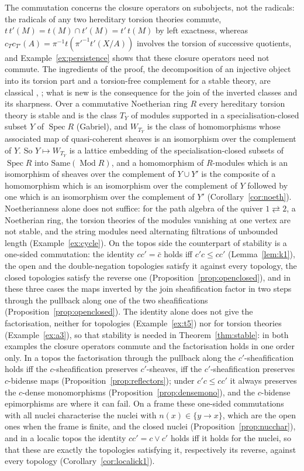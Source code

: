 \documentclass[11pt]{amsart}
\theoremstyle{definition}
\newcommand{\Same}{\mathrm{Same}}
\begin{document}
The commutation concerns the closure operators on subobjects, not the
radicals: the radicals of any two hereditary torsion theories commute,
$t\,t'(M)=t(M)\cap t'(M)=t'\,t(M)$ by left exactness, whereas
$c_Tc_{T'}(A)=\pi^{-1}t(\pi'^{-1}t'(X/A))$ involves the torsion of
successive quotients, and Example~\ref{ex:persistence} shows that these
closure operators need not commute. The ingredients of the proof, the
decomposition of an injective object into its torsion part and a
torsion-free complement for a stable theory, are classical
\cite[Ch.~VI, \S7]{Stenstrom}, \cite{Golan76}; what is new is the
consequence for the join of the inverted classes and its sharpness.
Over a commutative Noetherian ring $R$ every hereditary torsion theory is
stable and is the class $T_Y$ of modules supported in a specialisation-closed
subset $Y$ of $\operatorname{Spec}R$ (Gabriel), and $W_{T_Y}$ is the class of
homomorphisms whose associated map of quasi-coherent sheaves is an
isomorphism over the complement of $Y$. So $Y\mapsto W_{T_Y}$ is a lattice
embedding of the specialisation-closed subsets of $\operatorname{Spec}R$ into
$\Same(\operatorname{Mod}R)$, and a homomorphism of $R$-modules which is an
isomorphism of sheaves over the complement of $Y\cup Y'$ is the composite
of a homomorphism which is an isomorphism over the complement of $Y$
followed by one which is an isomorphism over the complement of $Y'$
(Corollary~\ref{cor:noeth}). Noetherianness alone does not
suffice: for the path algebra of the quiver $1\rightleftarrows2$, a
Noetherian ring, the torsion theories of the modules vanishing at one vertex
are not stable, and the string modules need alternating filtrations of
unbounded length (Example~\ref{ex:cycle}). On the topos side the
counterpart of stability is a one-sided commutation: the identity
$cc'=\bar c$ holds iff $c'c\le cc'$ (Lemma~\ref{lem:k1}), the open and the
double-negation topologies satisfy it against every topology, the closed
topologies satisfy the reverse one (Proposition~\ref{prop:openclosed}),
and in these three cases the maps inverted by the join sheafification
factor in two steps through the pullback along one of the two
sheafifications (Proposition~\ref{prop:openclosed}). The identity alone
does not give the factorisation, neither for topologies
(Example~\ref{ex:t5}) nor for torsion theories (Example~\ref{ex:a3}), so
that stability is needed in Theorem~\ref{thm:stable}: in both examples
the closure operators commute and the factorisation holds in one order
only. In a topos the factorisation through the pullback along the
$c'$-sheafification holds iff the $c$-sheafification preserves
$c'$-sheaves, iff the $c'$-sheafification preserves $c$-bidense maps
(Proposition~\ref{prop:reflectors}); under $c'c\le cc'$ it always
preserves the $c$-dense monomorphisms (Proposition~\ref{prop:densemono}),
and the $c$-bidense epimorphisms are where it can fail. On a frame these one-sided
commutations with all nuclei characterise the nuclei with $n(x)\in\{y\to
x\}$, which are the open ones when the frame is finite, and the closed
nuclei (Proposition~\ref{prop:nucchar}), and in a localic topos the
identity $cc'=c\vee c'$ holds iff it holds for the nuclei, so that these
are exactly the topologies satisfying it, respectively its reverse,
against every topology (Corollary~\ref{cor:localick1}).
\end{document}

